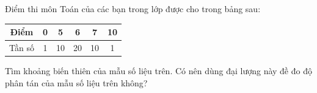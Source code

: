 \begin{bt}%
	Điểm thi môn Toán của các bạn trong lớp được cho trong bảng sau:
	\begin{center}
		\begin{tabular}{|c|c|c|c|c|c|}
			\hline Điểm & 0 & 5 & 6 & 7 & 10 \\
			\hline Tần số & 1 & 10 & 20 & 10 & 1 \\
			\hline
		\end{tabular}
	\end{center}
	Tìm khoảng biến thiên của mẫu số liệu trên. Có nên dùng đại lượng này đề đo độ phân tán của mẫu số liệu trên không?
\end{bt}

